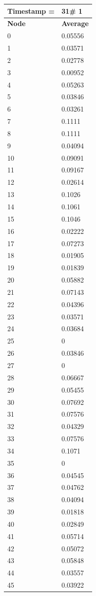 \begin{tabular}{|l||l|}
\hline
\textbf{Timestamp =} & \textbf{31}\# 1\\\hline
	\textbf{Node} & \textbf{Average} \\ \hline
\hline
	0 & 0.05556 \\ \hline
	1 & 0.03571 \\ \hline
	2 & 0.02778 \\ \hline
	3 & 0.00952 \\ \hline
	4 & 0.05263 \\ \hline
	5 & 0.03846 \\ \hline
	6 & 0.03261 \\ \hline
	7 & 0.1111 \\ \hline
	8 & 0.1111 \\ \hline
	9 & 0.04094 \\ \hline
	10 & 0.09091 \\ \hline
	11 & 0.09167 \\ \hline
	12 & 0.02614 \\ \hline
	13 & 0.1026 \\ \hline
	14 & 0.1061 \\ \hline
	15 & 0.1046 \\ \hline
	16 & 0.02222 \\ \hline
	17 & 0.07273 \\ \hline
	18 & 0.01905 \\ \hline
	19 & 0.01839 \\ \hline
	20 & 0.05882 \\ \hline
	21 & 0.07143 \\ \hline
	22 & 0.04396 \\ \hline
	23 & 0.03571 \\ \hline
	24 & 0.03684 \\ \hline
	25 & 0 \\ \hline
	26 & 0.03846 \\ \hline
	27 & 0 \\ \hline
	28 & 0.06667 \\ \hline
	29 & 0.05455 \\ \hline
	30 & 0.07692 \\ \hline
	31 & 0.07576 \\ \hline
	32 & 0.04329 \\ \hline
	33 & 0.07576 \\ \hline
	34 & 0.1071 \\ \hline
	35 & 0 \\ \hline
	36 & 0.04545 \\ \hline
	37 & 0.04762 \\ \hline
	38 & 0.04094 \\ \hline
	39 & 0.01818 \\ \hline
	40 & 0.02849 \\ \hline
	41 & 0.05714 \\ \hline
	42 & 0.05072 \\ \hline
	43 & 0.05848 \\ \hline
	44 & 0.03557 \\ \hline
	45 & 0.03922 \\ \hline
\end{tabular}
